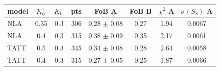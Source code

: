 \begin{tabular}{lcc r cc c c}\toprule
model & $K_0^+$ & $K_0^-$ & pts & FoB A & FoB B & $\chi^2$ A & $\sigma(S_8)$ A\\ \midrule
NLA & 0.35 & 0.3 & 306 & 0.28 $\pm$ 0.08 & 0.27 & 1.94 & 0.0067\\
NLA & 0.4 & 0.3 & 315 & 0.38 $\pm$ 0.09 & 0.35 & 2.17 & 0.0061\\
TATT & 0.5 & 0.3 & 345 & 0.34 $\pm$ 0.08 & 0.28 & 2.64 & 0.0058\\
TATT & 0.4 & 0.3 & 315 & 0.27 $\pm$ 0.05 & 0.25 & 1.87 & 0.0066\\
\bottomrule\end{tabular}